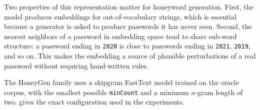 Two properties of this representation matter for honeyword generation.
First, the model produces embeddings for out-of-vocabulary strings,
which is essential because a generator is asked to produce passwords
it has never seen. Second, the nearest neighbors of a password in
embedding space tend to share sub-word structure: a password
ending in \texttt{2020} is close to passwords ending in \texttt{2021},
\texttt{2019}, and so on. This makes the embedding a source of
plausible perturbations of a real password without requiring
hand-written rules.

The HoneyGen family uses a skipgram FastText model trained on
the oracle corpus, with the smallest possible \texttt{minCount} and a
minimum $n$-gram length of two.  gives the exact
configuration used in the experiments.
